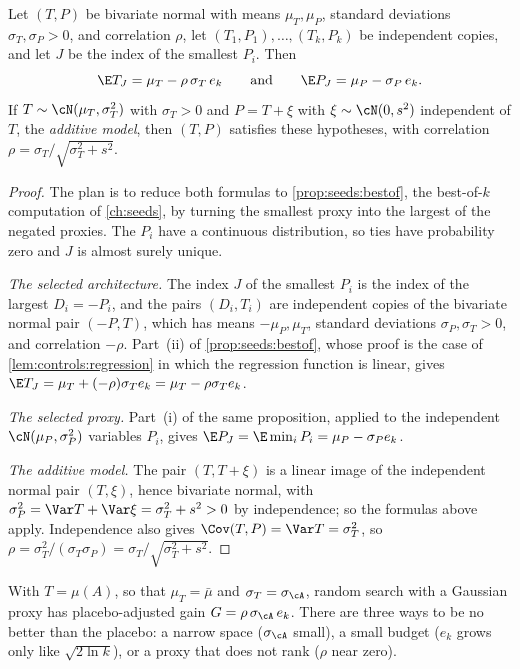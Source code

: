 \begin{refsection}
\begin{theorem}\label{thm:controls:gauss}
Let $(T,P)$ be bivariate normal with means $\mu_T,\mu_P$, standard deviations $\sigma_T,\sigma_P>0$, and correlation $\rho$, let $(T_1,P_1),\dots,(T_k,P_k)$ be independent copies, and let $J$ be the index of the smallest $P_i$. Then
\[
  \E T_J=\mu_T-\rho\,\sigma_T\,e_k\qquad\text{and}\qquad\E P_J=\mu_P-\sigma_P\,e_k .
\]
If $T\sim\cN(\mu_T,\sigma_T^2)$ with $\sigma_T>0$ and $P=T+\xi$ with $\xi\sim\cN(0,s^2)$ independent of $T$, the \emph{additive model}, then $(T,P)$ satisfies these hypotheses, with correlation $\rho=\sigma_T/\sqrt{\sigma_T^2+s^2}$.
\end{theorem}

\begin{proof}
The plan is to reduce both formulas to \cref{prop:seeds:bestof}, the best-of-$k$ computation of \cref{ch:seeds}, by turning the smallest proxy into the largest of the negated proxies. The $P_i$ have a continuous distribution, so ties have probability zero and $J$ is almost surely unique.

\emph{The selected architecture.} The index $J$ of the smallest $P_i$ is the index of the largest $D_i=-P_i$, and the pairs $(D_i,T_i)$ are independent copies of the bivariate normal pair $(-P,T)$, which has means $-\mu_P,\mu_T$, standard deviations $\sigma_P,\sigma_T>0$, and correlation $-\rho$. Part~(ii) of \cref{prop:seeds:bestof}, whose proof is the case of \cref{lem:controls:regression} in which the regression function is linear, gives $\E T_J=\mu_T+(-\rho)\sigma_Te_k=\mu_T-\rho\sigma_Te_k$.

\emph{The selected proxy.} Part~(i) of the same proposition, applied to the independent $\cN(\mu_P,\sigma_P^2)$ variables $P_i$, gives $\E P_J=\E\min_iP_i=\mu_P-\sigma_Pe_k$.

\emph{The additive model.} The pair $(T,T+\xi)$ is a linear image of the independent normal pair $(T,\xi)$, hence bivariate normal, with $\sigma_P^2=\Var T+\Var\xi=\sigma_T^2+s^2>0$ by independence; so the formulas above apply. Independence also gives $\Cov(T,P)=\Var T=\sigma_T^2$, so $\rho=\sigma_T^2/(\sigma_T\sigma_P)=\sigma_T/\sqrt{\sigma_T^2+s^2}$.
\end{proof}

With $T=\mu(A)$, so that $\mu_T=\bar\mu$ and $\sigma_T=\sigma_{\cA}$, random search with a Gaussian proxy has placebo-adjusted gain $G=\rho\,\sigma_{\cA}\,e_k$. There are three ways to be no better than the placebo: a narrow space ($\sigma_{\cA}$ small), a small budget ($e_k$ grows only like $\sqrt{2\ln k}$), or a proxy that does not rank ($\rho$ near zero).


\end{refsection}
